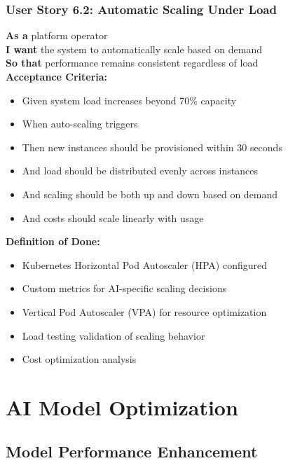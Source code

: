 \subsubsection{User Story 6.2: Automatic Scaling Under Load}

\begin{tcolorbox}[colback=lightgray, colframe=primaryblue, title=US-6.2: Automatic Scaling Under Load]
\textbf{As a} platform operator \\
\textbf{I want} the system to automatically scale based on demand \\
\textbf{So that} performance remains consistent regardless of load \\

\textbf{Acceptance Criteria:}
\begin{itemize}
    \item Given system load increases beyond 70\% capacity
    \item When auto-scaling triggers
    \item Then new instances should be provisioned within 30 seconds
    \item And load should be distributed evenly across instances
    \item And scaling should be both up and down based on demand
    \item And costs should scale linearly with usage
\end{itemize}

\textbf{Definition of Done:}
\begin{itemize}
    \item Kubernetes Horizontal Pod Autoscaler (HPA) configured
    \item Custom metrics for AI-specific scaling decisions
    \item Vertical Pod Autoscaler (VPA) for resource optimization
    \item Load testing validation of scaling behavior
    \item Cost optimization analysis
\end{itemize}
\end{tcolorbox}

\section{AI Model Optimization}

\subsection{Model Performance Enhancement}

